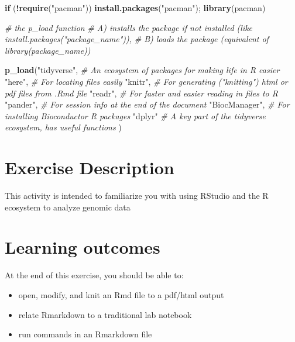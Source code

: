 \documentclass[
]{book}
\newenvironment{Shaded}{\begin{snugshade}}{\end{snugshade}}
\newcommand{\CommentTok}[1]{\textcolor[rgb]{0.56,0.35,0.01}{\textit{#1}}}
\newcommand{\ControlFlowTok}[1]{\textcolor[rgb]{0.13,0.29,0.53}{\textbf{#1}}}
\newcommand{\FunctionTok}[1]{\textcolor[rgb]{0.13,0.29,0.53}{\textbf{#1}}}
\newcommand{\NormalTok}[1]{#1}
\newcommand{\SpecialCharTok}[1]{\textcolor[rgb]{0.81,0.36,0.00}{\textbf{#1}}}
\newcommand{\StringTok}[1]{\textcolor[rgb]{0.31,0.60,0.02}{#1}}
\providecommand{\tightlist}{%
  \setlength{\itemsep}{0pt}\setlength{\parskip}{0pt}}
\theoremstyle{definition}
\theoremstyle{definition}
\theoremstyle{definition}
\theoremstyle{definition}
\theoremstyle{remark}
\begin{document}
\begin{Shaded}
\begin{Highlighting}[]
\ControlFlowTok{if}\NormalTok{ (}\SpecialCharTok{!}\FunctionTok{require}\NormalTok{(}\StringTok{"pacman"}\NormalTok{)) }\FunctionTok{install.packages}\NormalTok{(}\StringTok{"pacman"}\NormalTok{); }\FunctionTok{library}\NormalTok{(pacman)}

\CommentTok{\# the p\_load function }
\CommentTok{\#    A) installs the package if not installed (like install.packages("package\_name")),}
\CommentTok{\#    B) loads the package (equivalent of library(package\_name))}

\FunctionTok{p\_load}\NormalTok{(}\StringTok{"tidyverse"}\NormalTok{, }\CommentTok{\# An ecosystem of packages for making life in R easier}
       \StringTok{"here"}\NormalTok{, }\CommentTok{\# For locating files easily}
       \StringTok{"knitr"}\NormalTok{, }\CommentTok{\# For generating ("knitting") html or pdf files from .Rmd file}
       \StringTok{"readr"}\NormalTok{, }\CommentTok{\# For faster and easier reading in files to R}
       \StringTok{"pander"}\NormalTok{, }\CommentTok{\# For session info at the end of the document}
       \StringTok{"BiocManager"}\NormalTok{, }\CommentTok{\# For installing Bioconductor R packages}
       \StringTok{"dplyr"} \CommentTok{\# A key part of the tidyverse ecosystem, has useful functions}
\NormalTok{       )}
\end{Highlighting}
\end{Shaded}

\hypertarget{exercise-description}{%
\section{Exercise Description}\label{exercise-description}}

This activity is intended to familiarize you with using RStudio and the R ecosystem to analyze genomic data

\hypertarget{learning-outcomes}{%
\section{Learning outcomes}\label{learning-outcomes}}

At the end of this exercise, you should be able to:

\begin{itemize}
\tightlist
\item
  open, modify, and knit an Rmd file to a pdf/html output
\item
  relate Rmarkdown to a traditional lab notebook
\item
  run commands in an Rmarkdown file
\end{itemize}
\end{document}
